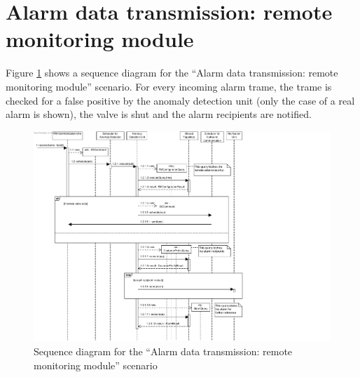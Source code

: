 \section{Alarm data transmission: remote monitoring module}
\label{scenario:rm-alarm}

\npar Figure \ref{fig:scenario-5-9} shows a sequence diagram for the ``Alarm
data transmission: remote monitoring module'' scenario. For every incoming
alarm trame, the trame is checked for a false positive by the anomaly detection
unit (only the case of a real alarm is shown), the valve is shut and the alarm
recipients are notified.

\begin{figure}[H]
	\begin{centering}
		\includegraphics[width=\textwidth]{figs/scenario-5-9.pdf}
		\caption{Sequence diagram for the ``Alarm data transmission: remote monitoring
		module'' scenario}
		\label{fig:scenario-5-9}
	\end{centering}
\end{figure}